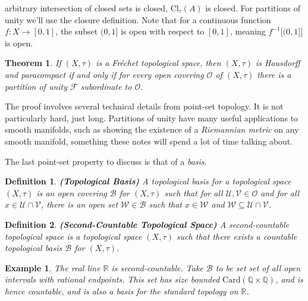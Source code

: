 \documentclass{article}
\theoremstyle{plain}
\newtheorem{theorem}{Theorem}[section]
\theoremstyle{normal}
\newtheorem{definition}{Definition}[section]
\newtheorem{example}{Example}[section]
\begin{document}
        arbitrary intersection of closed sets is closed, $\textrm{Cl}_{\tau}(A)$
        is closed. For partitions of unity we'll use the closure definition.
        Note that for a continuous function $f:X\rightarrow[0,1]$, the subset
        $(0,1]$ is open with respect to $[0,1]$, meaning $f^{-1}\big[(0,1]\big]$
        is open.
        \begin{theorem}
            If $(X,\tau)$ is a Fr\'{e}chet topological space, then $(X,\tau)$ is
            Hausdorff and paracompact if and only if for every open covering
            $\mathcal{O}$ of $(X,\tau)$ there is a partition of unity
            $\mathcal{F}$ subordinate to $\mathcal{O}$.
        \end{theorem}
        The proof involves several technical details from point-set topology.
        It is not particularly hard, just long. Partitions of unity have many
        useful applications to smooth manifolds, such as showing the existence
        of a \textit{Riemannian metric} on any smooth manifold, something these
        notes will spend a lot of time talking about.
        \par\hfill\par
        The last point-set property to discuss is that of a \textit{basis}.
        \begin{definition}{\textbf{(Topological Basis)}}
            A topological basis for a topological space $(X,\tau)$ is an open
            covering $\mathcal{B}$ for $(X,\tau)$ such that for all
            $\mathcal{U},\mathcal{V}\in\mathcal{O}$ and for all
            $x\in\mathcal{U}\cap\mathcal{V}$, there is an open set
            $\mathcal{W}\in\mathcal{B}$ such that $x\in\mathcal{W}$ and
            $\mathcal{W}\subseteq\mathcal{U}\cap\mathcal{V}$.
        \end{definition}
        \begin{definition}{\textbf{(Second-Countable Topological Space)}}
            A second-countable topological space is a topological space
            $(X,\tau)$ such that there exists a countable topological basis
            $\mathcal{B}$ for $(X,\tau)$.
        \end{definition}
        \begin{example}
            The real line $\mathbb{R}$ is second-countable. Take $\mathcal{B}$
            to be set set of all open intervals with rational endpoints. This
            set has size bounded $\textrm{Card}(\mathbb{Q}\times\mathbb{Q})$,
            and is hence countable, and is also a basis for the standard
            topology on $\mathbb{R}$.
        \end{example}
\end{document}

